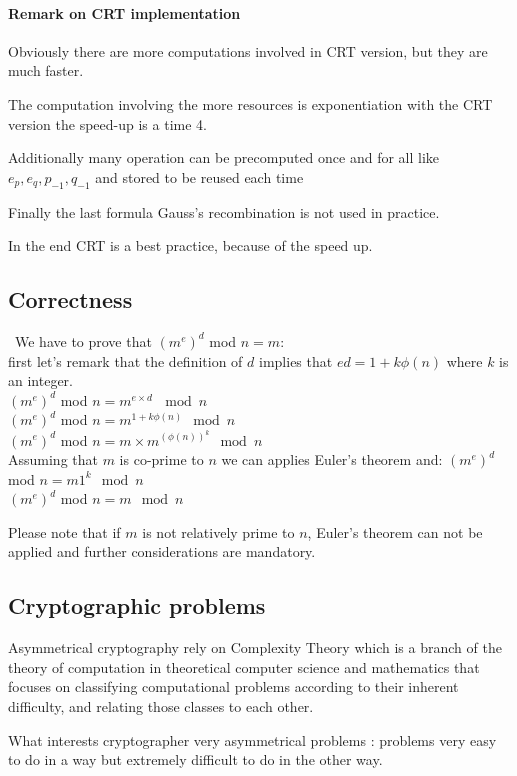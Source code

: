 \paragraph*{Remark on CRT implementation} 
	Obviously there are more computations involved in CRT version, but they are much faster.

	The computation involving the more resources is exponentiation with the CRT version the speed-up is a time 4.

	Additionally many operation can be precomputed once and for all like
	$e_p,e_q,p_{-1},q_{-1}$ and stored to be reused each time

	Finally the last formula Gauss's recombination is not used in practice.

	In the end CRT is a best practice, because of the speed up.

\subsection*{Correctness}\
	We have to prove that $ (m^e)^d $ mod $ n =m $: \\
	first let's remark that the definition of $d$ implies that 
	$ed=1+k \phi(n)$ where $k$ is an integer.\\
	$ (m^e)^d $ mod $n = m^{e \times d} \, \mod  n $\\
	$ (m^e)^d $ mod $ n = m^{1+k \phi(n)} \mod n $\\
	$ (m^e)^d $ mod $ n = m \times m^({\phi(n)})^k \mod n $\\
	Assuming that $m$ is co-prime to $n$ we can applies Euler's theorem and:
	$ (m^e)^d $ mod $ n = m 1^k \mod n $\\
	$ (m^e)^d $ mod $ n = m   \mod  n $ 
	
	Please note that if $m$ is not relatively prime to $n$, Euler's theorem can not be applied and further considerations are mandatory.

\newpage
\subsection{Cryptographic problems}

Asymmetrical cryptography rely on Complexity Theory which is a branch
of the theory of computation in theoretical computer science and mathematics 
that focuses on classifying computational problems according to their inherent 
difficulty, and relating those classes to each other.

What interests cryptographer very asymmetrical problems : problems very easy to
do in a way but extremely difficult to do in the other way.

